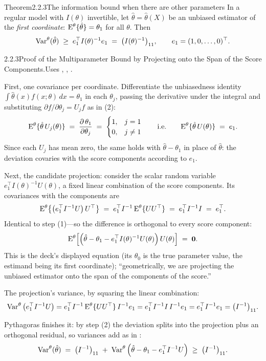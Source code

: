 \documentclass[main.tex]{subfiles}
\begin{document}
\begin{Obj}{Theorem}{2.2.3}{The information bound when there are other parameters}
In a regular model with $I(\theta)$ invertible, let $\hat\theta=\hat\theta(X)$ be an
unbiased estimator of the \emph{first coordinate}: $\mathrm{E}^{\theta}\{\hat\theta\}=\theta_1$ for
all $\theta$. Then
\[ \operatorname{Var}^{\theta}(\hat\theta) \;\ge\; e_1^{\top} I(\theta)^{-1} e_1
   \;=\; \big(I(\theta)^{-1}\big)_{11} , \qquad e_1=(1,0,\dots,0)^{\top} . \]
\end{Obj}
\begin{Prf}{2.2.3}{Proof of the Multiparameter Bound by Projecting onto the Span of the Score Components.}{Uses , , .}
\item First, one covariance per coordinate. Differentiate the unbiasedness identity
      $\int \hat\theta(x) f(x;\theta)\,dx = \theta_1$ in each $\theta_j$, passing the
      derivative under the integral and substituting
      $\partial f/\partial\theta_j = U_j f$ as in (2):
      \[ \mathrm{E}^{\theta}\{\hat\theta\, U_j(\theta)\} \;=\;
         \frac{\partial\,\theta_1}{\partial\theta_j} \;=\;
         \begin{cases} 1, & j=1\\ 0, & j\ne 1 \end{cases}
         \qquad\text{i.e.}\qquad
         \mathrm{E}^{\theta}\{\hat\theta\, U(\theta)\} \;=\; e_1 . \]
      Since each $U_j$ has mean zero, the same holds with $\hat\theta-\theta_1$ in place of
      $\hat\theta$: the deviation covaries with the score components according to $e_1$.
\item Next, the candidate projection: consider the scalar random variable
      $e_1^{\top} I(\theta)^{-1} U(\theta)$, a fixed linear combination of the score
      components. Its covariances with the components are
      \[ \mathrm{E}^{\theta}\big\{ \big(e_1^{\top} I^{-1} U\big)\, U^{\top} \big\}
         \;=\; e_1^{\top} I^{-1}\, \mathrm{E}^{\theta}\{U U^{\top}\}
         \;=\; e_1^{\top} I^{-1} I \;=\; e_1^{\top} . \]
      Identical to step (1)---so the difference is orthogonal to every score component:
      \[ \mathrm{E}^{\theta}\Big[ \Big( \hat\theta - \theta_1 - e_1^{\top} I(\theta)^{-1}
         U(\theta) \Big)\, U(\theta) \Big] \;=\; \mathbf{0} . \]
      This is the deck's displayed equation (its $\theta_0$ is the true parameter value, the
      estimand being its first coordinate); ``geometrically, we are projecting the unbiased
      estimator onto the span of the components of the score.''
\item The projection's variance, by squaring the linear combination:
      \[ \operatorname{Var}^{\theta}\big( e_1^{\top} I^{-1} U \big)
         = e_1^{\top} I^{-1}\,\mathrm{E}^{\theta}\{U U^{\top}\}\, I^{-1} e_1
         = e_1^{\top} I^{-1} I\, I^{-1} e_1
         = e_1^{\top} I^{-1} e_1 = \big(I^{-1}\big)_{11} . \]
\item Pythagoras finishes it: by step (2) the deviation splits into the projection plus an
      orthogonal residual, so variances add as in :
      \[ \operatorname{Var}^{\theta}(\hat\theta)
         \;=\; \big(I^{-1}\big)_{11} \;+\;
         \operatorname{Var}^{\theta}\Big( \hat\theta-\theta_1- e_1^{\top} I^{-1} U \Big)
         \;\ge\; \big(I^{-1}\big)_{11} . \]
\end{Prf}
\end{document}
